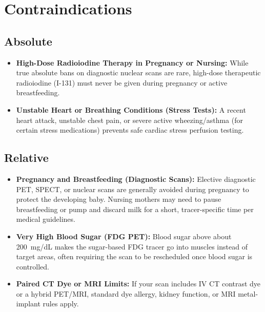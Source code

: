 \section{Contraindications}

\subsection{Absolute}
\begin{itemize}
  \item \textbf{High-Dose Radioiodine Therapy in Pregnancy or Nursing:} While true absolute bans on diagnostic nuclear scans are rare, high-dose therapeutic radioiodine (I-131) must never be given during pregnancy or active breastfeeding.
  \item \textbf{Unstable Heart or Breathing Conditions (Stress Tests):} A recent heart attack, unstable chest pain, or severe active wheezing/asthma (for certain stress medications) prevents safe cardiac stress perfusion testing.
\end{itemize}

\subsection{Relative}
\begin{itemize}
  \item \textbf{Pregnancy and Breastfeeding (Diagnostic Scans):} Elective diagnostic PET, SPECT, or nuclear scans are generally avoided during pregnancy to protect the developing baby. Nursing mothers may need to pause breastfeeding or pump and discard milk for a short, tracer-specific time per medical guidelines.
  \item \textbf{Very High Blood Sugar (FDG PET):} Blood sugar above about 200~mg/dL makes the sugar-based FDG tracer go into muscles instead of target areas, often requiring the scan to be rescheduled once blood sugar is controlled.
  \item \textbf{Paired CT Dye or MRI Limits:} If your scan includes IV CT contrast dye or a hybrid PET/MRI, standard dye allergy, kidney function, or MRI metal-implant rules apply.
\end{itemize}

